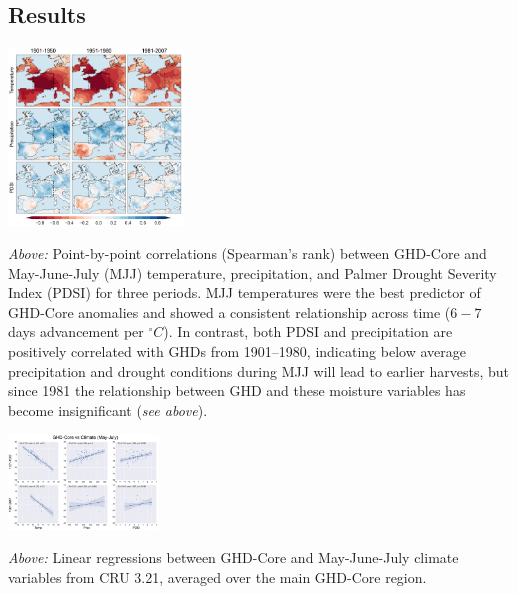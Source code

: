 \documentclass[portrait,a0,final] {a0poster} %
\begin{document}
\begin{multicols}{2}
\section*{Results}
\begin{center}
\includegraphics[width=0.35\textwidth]{../MANUSCRIPT/fig_02_core_cru_MJJ.png}
\end{center}
\vspace{1ex}
\emph{Above:} Point-by-point correlations (Spearman's rank) between GHD-Core and May-June-July (MJJ) temperature, precipitation, and Palmer Drought Severity Index (PDSI) for three periods. MJJ temperatures were the best predictor of GHD-Core anomalies and showed a consistent relationship across time ($6-7$ days advancement per $^{\circ}C$). In contrast, both PDSI and precipitation are positively correlated with GHDs from 1901--1980, indicating below average precipitation and drought conditions during MJJ will lead to earlier harvests, but since 1981 the relationship between GHD and these moisture variables has become insignificant (\emph{see above}). 
\begin{center}
\includegraphics[width=0.3\textwidth]{../MANUSCRIPT/fig_03_MJJ_clim_regplots.png}
\end{center}
\vspace{1ex}
\emph{Above:} Linear regressions between GHD-Core and May-June-July climate variables from CRU 3.21, averaged over the main GHD-Core region.\\


\end{multicols}
\end{document}
